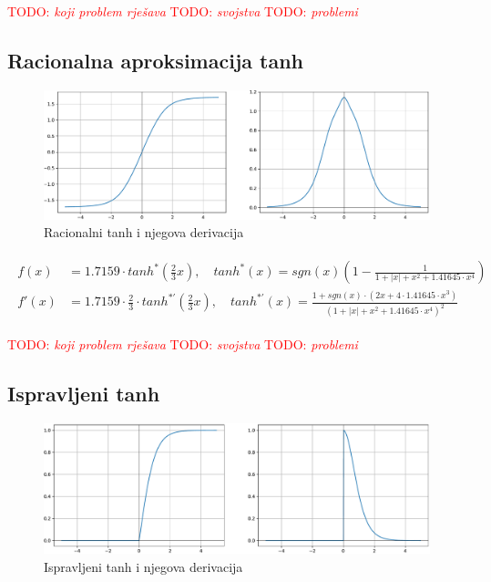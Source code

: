 \documentclass[times, utf8, diplomski]{fer}
\def\TODO#1{\noindent\textcolor{red}{TODO: \textit{#1}}\newline}
\def\todo#1{\TODO{#1}}
\begin{document}
\todo{koji problem rješava}
\todo{svojstva}
\todo{problemi}

\subsection{Racionalna aproksimacija tanh}

\begin{figure}[H]
\includegraphics[width=\textwidth]{Rational_tanh.pdf}
\centering
\caption{Racionalni tanh i njegova derivacija}
\label{fig:rational_tanh}
\end{figure}

\begin{align}
\begin{split}
f(x) &= 1.7159 \cdot tanh^*(\frac{2}{3}x), \quad
tanh^*(x) = sgn(x)(1 - \frac{1}{1 + |x| + x^2 + 1.41645 \cdot x^4}) \\
f'(x) &= 1.7159 \cdot \frac{2}{3} \cdot tanh^{*'}(\frac{2}{3}x), \quad
tanh^{*'}(x) = \frac{1+sgn(x) \cdot (2x + 4 \cdot 1.41645 \cdot x^3)}{(1 + |x| + x^2 + 1.41645 \cdot x^4)^2}
\end{split}
\end{align}

\todo{koji problem rješava}
\todo{svojstva}
\todo{problemi}

\subsection{Ispravljeni tanh}

\begin{figure}[H]
\includegraphics[width=\textwidth]{Rectified_tanh.pdf}
\centering
\caption{Ispravljeni tanh i njegova derivacija}
\label{fig:rectified_tanh}
\end{figure}
\end{document}
